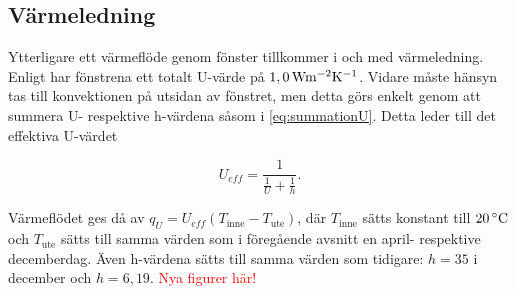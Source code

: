 \subsection{Värmeledning}

Ytterligare ett värmeflöde genom fönster tillkommer i och med värmeledning. Enligt \cite{petersarneo} har fönstrena ett totalt U-värde på $\unit[1,0]{Wm^{-2}K^{-1}}$. Vidare måste hänsyn tas till konvektionen på utsidan av fönstret, men detta görs enkelt genom att summera U- respektive h-värdena såsom i \ref{eq:summationU}. Detta leder till det effektiva U-värdet

\begin{equation}
U_{eff} = \frac{1}{\frac{1}{U} + \frac{1}{h}}.
\end{equation}

Värmeflödet ges då av $q_{U}=U_{eff} \left( T_\text{inne}-T_\text{ute} \right)$, där $T_\text{inne}$ sätts konstant till $\unit[20]{^{\circ}C}$ och $T_\text{ute}$ sätts till samma värden som i föregående avsnitt en april- respektive decemberdag. Även h-värdena sätts till samma värden som tidigare: $h=35$ i december och $h=6,19$.
\textcolor{red}{Nya figurer här!}
